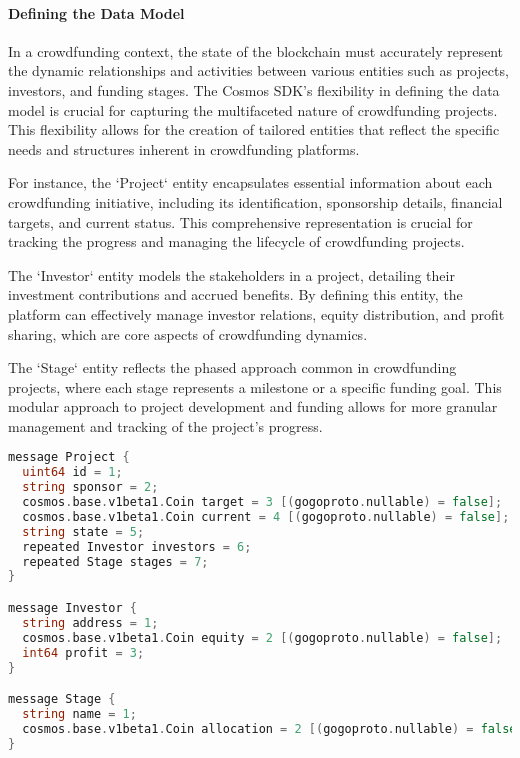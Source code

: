 \paragraph{Defining the Data Model}
\label{par:defining-the-data-model}

In a crowdfunding context, the state of the blockchain must accurately represent the dynamic relationships and activities between various entities such as projects, investors, and funding stages. The Cosmos SDK's flexibility in defining the data model is crucial for capturing the multifaceted nature of crowdfunding projects. This flexibility allows for the creation of tailored entities that reflect the specific needs and structures inherent in crowdfunding platforms.

For instance, the `Project` entity encapsulates essential information about each crowdfunding initiative, including its identification, sponsorship details, financial targets, and current status. This comprehensive representation is crucial for tracking the progress and managing the lifecycle of crowdfunding projects.

The `Investor` entity models the stakeholders in a project, detailing their investment contributions and accrued benefits. By defining this entity, the platform can effectively manage investor relations, equity distribution, and profit sharing, which are core aspects of crowdfunding dynamics.

The `Stage` entity reflects the phased approach common in crowdfunding projects, where each stage represents a milestone or a specific funding goal. This modular approach to project development and funding allows for more granular management and tracking of the project's progress.

\begin{lstlisting}[language=go, caption={Protobuf Definitions for Project, Investor, and Stage}, label=lst:protobuf-definitions]
message Project {
  uint64 id = 1;
  string sponsor = 2;
  cosmos.base.v1beta1.Coin target = 3 [(gogoproto.nullable) = false];
  cosmos.base.v1beta1.Coin current = 4 [(gogoproto.nullable) = false];
  string state = 5;
  repeated Investor investors = 6;
  repeated Stage stages = 7;
}

message Investor {
  string address = 1;
  cosmos.base.v1beta1.Coin equity = 2 [(gogoproto.nullable) = false];
  int64 profit = 3;
}

message Stage {
  string name = 1;
  cosmos.base.v1beta1.Coin allocation = 2 [(gogoproto.nullable) = false];
}
\end{lstlisting}


